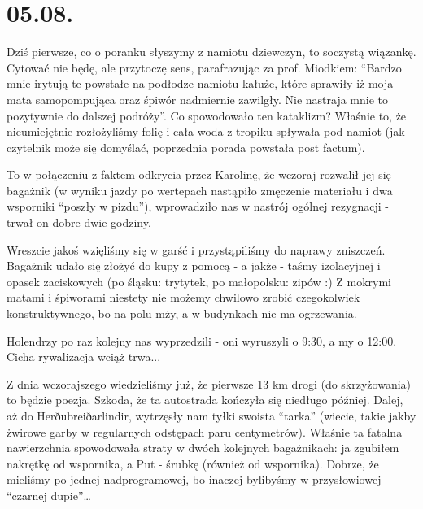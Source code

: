 \chapter{05.08.}

Dziś pierwsze, co o poranku słyszymy z namiotu dziewczyn, to soczystą wiązankę. Cytować nie będę, ale przytoczę sens, parafrazując za prof. Miodkiem: “Bardzo mnie irytują te powstałe na podłodze namiotu kałuże, które sprawiły iż moja mata samopompująca oraz śpiwór nadmiernie zawilgły. Nie nastraja mnie to pozytywnie do dalszej podróży”. Co spowodowało ten kataklizm? Właśnie to, że nieumiejętnie rozłożyliśmy folię i cała woda z tropiku spływała pod namiot (jak czytelnik może się domyślać, poprzednia porada powstała post factum).

To w połączeniu z faktem odkrycia przez Karolinę, że wczoraj rozwalił jej się bagażnik (w wyniku jazdy po wertepach nastąpiło zmęczenie materiału i dwa wsporniki “poszły w pizdu”), wprowadziło nas w nastrój ogólnej rezygnacji - trwał on dobre dwie godziny.

Wreszcie jakoś wzięliśmy się w garść i przystąpiliśmy do naprawy zniszczeń. Bagażnik udało się złożyć do kupy z pomocą - a jakże - taśmy izolacyjnej i opasek zaciskowych (po śląsku: trytytek, po małopolsku: zipów :) Z mokrymi matami i śpiworami niestety nie możemy chwilowo zrobić czegokolwiek konstruktywnego, bo na polu mży, a w budynkach nie ma ogrzewania.

Holendrzy po raz kolejny nas wyprzedzili - oni wyruszyli o 9:30, a my o 12:00. Cicha rywalizacja wciąż trwa...

Z dnia wczorajszego wiedzieliśmy już, że pierwsze 13 km drogi (do skrzyżowania) to będzie poezja. Szkoda, że ta autostrada kończyła się niedługo później. Dalej, aż do Herðubreiðarlindir, wytrzęsły nam tyłki swoista “tarka” (wiecie, takie jakby żwirowe garby w regularnych odstępach paru centymetrów). Właśnie ta fatalna nawierzchnia spowodowała straty w dwóch kolejnych bagażnikach: ja zgubiłem nakrętkę od wspornika, a Put - śrubkę (również od wspornika). Dobrze, że mieliśmy po jednej nadprogramowej, bo inaczej bylibyśmy w przysłowiowej “czarnej dupie”…



